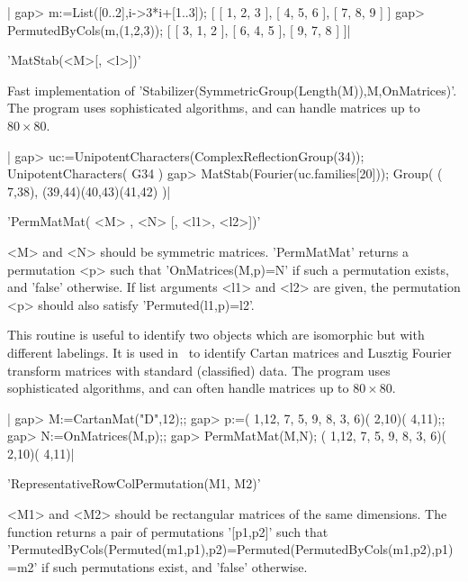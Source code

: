 |    gap> m:=List([0..2],i->3*i+[1..3]);
    [ [ 1, 2, 3 ], [ 4, 5, 6 ], [ 7, 8, 9 ] ]
    gap> PermutedByCols(m,(1,2,3));
    [ [ 3, 1, 2 ], [ 6, 4, 5 ], [ 9, 7, 8 ] ]|

%
%

'MatStab(<M>[, <l>])'

Fast implementation of
'Stabilizer(SymmetricGroup(Length(M)),M,OnMatrices)'.   The   program  uses
sophisticated algorithms, and can handle matrices up to $80\times 80$.

|    gap> uc:=UnipotentCharacters(ComplexReflectionGroup(34));
    UnipotentCharacters( G34 )
    gap> MatStab(Fourier(uc.families[20]));
    Group( ( 7,38), (39,44)(40,43)(41,42) )|

%
%

'PermMatMat( <M> , <N> [, <l1>, <l2>])'

<M>  and  <N>  should  be  symmetric  matrices.  'PermMatMat'  returns a
permutation  <p>  such  that  'OnMatrices(M,p)=N'  if such a permutation
exists,  and  'false'  otherwise.  If  list  arguments <l1> and <l2> are
given, the permutation <p> should also satisfy 'Permuted(l1,p)=l2'.

This  routine is useful to identify two objects which are isomorphic but
with  different labelings.  It is  used in  \CHEVIE\ to  identify Cartan
matrices   and   Lusztig   Fourier   transform  matrices  with  standard
(classified)  data. The  program uses  sophisticated algorithms, and can
often handle matrices up to $80\times 80$.

|    gap> M:=CartanMat("D",12);;
    gap> p:=( 1,12, 7, 5, 9, 8, 3, 6)( 2,10)( 4,11);;
    gap> N:=OnMatrices(M,p);;
    gap> PermMatMat(M,N);
    ( 1,12, 7, 5, 9, 8, 3, 6)( 2,10)( 4,11)|

%
%

'RepresentativeRowColPermutation(M1, M2)'

<M1>  and <M2> should  be rectangular matrices  of the same dimensions. The
function returns a pair of permutations '[p1,p2]' such that
'PermutedByCols(Permuted(m1,p1),p2)=Permuted(PermutedByCols(m1,p2),p1)=m2'
if such permutations exist, and 'false' otherwise.

